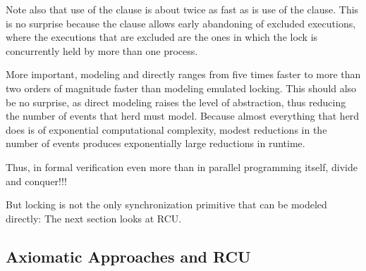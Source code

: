 {	Note also that use of the  clause is about twice
	as fast as is use of the  clause.
	This is no surprise because the  clause allows
	early abandoning of excluded executions, where the executions
	that are excluded are the ones in which the lock is concurrently
	held by more than one process.

	More important, modeling  and 
	directly ranges from five times faster to more than two orders
	of magnitude faster than modeling emulated locking.
	This should also be no surprise, as direct modeling raises
	the level of abstraction, thus reducing the number of events
	that herd must model.
	Because almost everything that herd does is of exponential
	computational complexity, modest reductions in the number of
	events produces exponentially large reductions in runtime.

	Thus, in formal verification even more than in parallel
	programming itself, divide and conquer!!!
}\QuickQuizEnd

But locking is not the only synchronization primitive that can be
modeled directly:
The next section looks at RCU\@.

\subsection{Axiomatic Approaches and RCU}
\label{sec:formal:Axiomatic Approaches and RCU}

